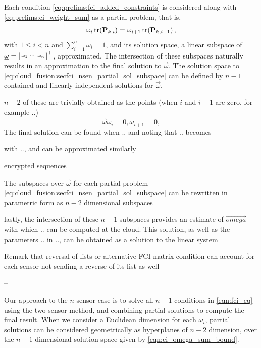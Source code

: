 Each condition \eqref{eq:prelims:fci_added_constraints} is considered along with \eqref{eq:prelims:ci_weight_sum} as a partial problem, that is,
\begin{equation}\label{eq:cloud_fusion:secfci_nsen_partial_sol_subspace}
    \omega_i\tr(\mat{P}_{k,i}) = \omega_{i+1}\tr(\mat{P}_{k,i+1})\,,
\end{equation}
with $1\leq i< n$ and $\sum_{i=1}^n\omega_i=1$, and its solution space, a linear subspace of $\vec{\omega}=\begin{bsmallmatrix}\omega_1 & \cdots & \omega_n\end{bsmallmatrix}^\top$, approximated. The intersection of these subspaces naturally results in an approximation to the final solution to $\vec{\omega}$. The solution space to \eqref{eq:cloud_fusion:secfci_nsen_partial_sol_subspace} can be defined by $n-1$ contained and linearly independent solutions for $\vec{\omega}$. 

$n-2$ of these are trivially obtained as the points (when $i$ and $i+1$ are zero, for example ..)
\begin{equation}
    \vec{\omega} \bar \omega_i=0,\omega_{i+1}=0,
\end{equation}
The final solution can be found when .. and noting that .. becomes

with .., and can be approximated similarly 

encrypted sequences



The subspaces over $\vec{\omega}$ for each partial problem \eqref{eq:cloud_fusion:secfci_nsen_partial_sol_subspace} can be rewritten in parametric form as $n-2$ dimensional subspaces

lastly, the intersection of these $n-1$ subspaces provides an estimate of $\vec{omega}$ with which .. can be computed at the cloud. This solution, as well as the parameters .. in .., can be obtained as a solution to the linear system



Remark that reversal of lists or alternative FCI matrix condition can account for each sensor not sending a reverse of its list as well


--


Our approach to the $n$ sensor case is to solve all $n-1$ conditions in \eqref{eqn:fci_eq} using the two-sensor method, and combining partial solutions to compute the final result. When we consider a Euclidean dimension for each $\omega_i$, partial solutions can be considered geometrically as hyperplanes of $n-2$ dimension, over the $n-1$ dimensional solution space given by \eqref{eqn:ci_omega_sum_bound}. 

